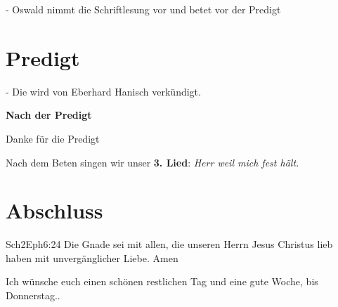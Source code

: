 \documentclass{../inc/mybib}
\begin{document}
- Oswald nimmt die Schriftlesung vor und betet vor der Predigt

\section{Predigt}
- Die wird von Eberhard Hanisch verkündigt.

\textbf{Nach der Predigt}

Danke für die Predigt

Nach dem Beten singen wir unser \textbf{3. Lied}: \textit{Herr weil mich fest hält.}\\

\section{Abschluss}

\begin{bibeltext}{Sch2}{Eph}{6:24}
Die Gnade sei mit allen, die unseren Herrn Jesus Christus lieb haben mit unvergänglicher Liebe. Amen
\end{bibeltext}

Ich wünsche euch einen schönen restlichen Tag und eine gute Woche, bis Donnerstag..
\end{document}
